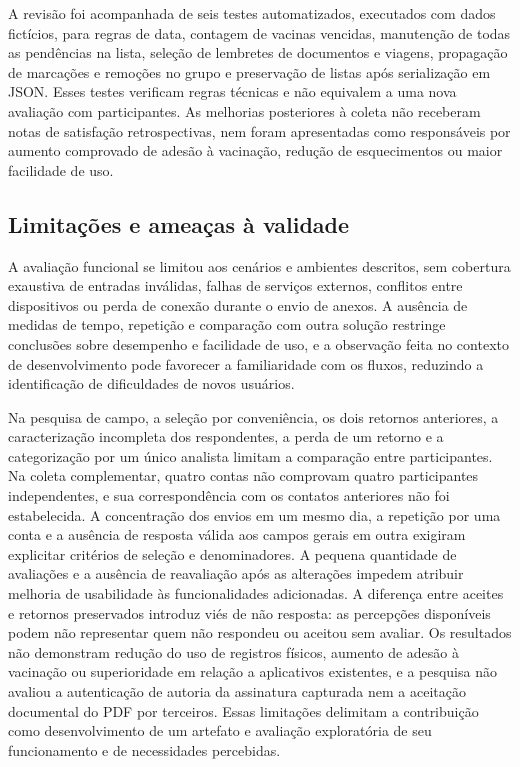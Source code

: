 \documentclass{UNESC}
\begin{document}
A revisão foi acompanhada de seis testes automatizados, executados com dados fictícios, para regras de data, contagem de vacinas vencidas, manutenção de todas as pendências na lista, seleção de lembretes de documentos e viagens, propagação de marcações e remoções no grupo e preservação de listas após serialização em JSON. Esses testes verificam regras técnicas e não equivalem a uma nova avaliação com participantes. As melhorias posteriores à coleta não receberam notas de satisfação retrospectivas, nem foram apresentadas como responsáveis por aumento comprovado de adesão à vacinação, redução de esquecimentos ou maior facilidade de uso.


\subsection{Limitações e ameaças à validade}

A avaliação funcional se limitou aos cenários e ambientes descritos, sem cobertura exaustiva de entradas inválidas, falhas de serviços externos, conflitos entre dispositivos ou perda de conexão durante o envio de anexos. A ausência de medidas de tempo, repetição e comparação com outra solução restringe conclusões sobre desempenho e facilidade de uso, e a observação feita no contexto de desenvolvimento pode favorecer a familiaridade com os fluxos, reduzindo a identificação de dificuldades de novos usuários.

Na pesquisa de campo, a seleção por conveniência, os dois retornos anteriores, a caracterização incompleta dos respondentes, a perda de um retorno e a categorização por um único analista limitam a comparação entre participantes. Na coleta complementar, quatro contas não comprovam quatro participantes independentes, e sua correspondência com os contatos anteriores não foi estabelecida. A concentração dos envios em um mesmo dia, a repetição por uma conta e a ausência de resposta válida aos campos gerais em outra exigiram explicitar critérios de seleção e denominadores. A pequena quantidade de avaliações e a ausência de reavaliação após as alterações impedem atribuir melhoria de usabilidade às funcionalidades adicionadas. A diferença entre aceites e retornos preservados introduz viés de não resposta: as percepções disponíveis podem não representar quem não respondeu ou aceitou sem avaliar. Os resultados não demonstram redução do uso de registros físicos, aumento de adesão à vacinação ou superioridade em relação a aplicativos existentes, e a pesquisa não avaliou a autenticação de autoria da assinatura capturada nem a aceitação documental do PDF por terceiros. Essas limitações delimitam a contribuição como desenvolvimento de um artefato e avaliação exploratória de seu funcionamento e de necessidades percebidas.
\end{document}
